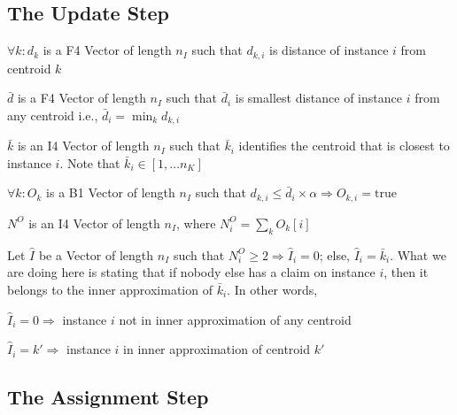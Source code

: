 \subsection{The Update Step}
\label{update}

\be
\item \(\forall k: d_k \) is a F4 Vector of length \(n_I\) such that \(d_{k, i}\)
is distance of instance \(i\) from centroid \(k\)
\item \(\bar{d}\) is a F4 Vector of length \(n_I\) such that \(\bar{d}_i\) is
smallest distance of instance \(i\) from any centroid i.e.,
\(\bar{d}_i = \min_k d_{k, i}\)
\item \(\bar{k}\) is an I4 Vector of length \(n_I\) such that \(\bar{k}_i\) identifies
the centroid that is closest to instance \(i\). Note that 
\(\bar{k}_i \in [1, \ldots n_K]\)
\item \(\forall k: O_k\) is a B1 Vector of length \(n_I\) such that 
\(d_{k, i} \leq \bar{d}_i \times \alpha \Rightarrow O_{k, i} = \mathrm{true}\)
\item \(N^O\) is an I4 Vector of length \(n_I\), 
where \(N^O_i  = \sum_k O_k[i]\)
\item Let \(\hat{I}\) be a Vector of length \(n_I\) such that 
\(N^O_i \geq 2 \Rightarrow \hat{I}_i = 0\); else, \(\hat{I}_i = \bar{k}_i\). What
we are doing here is stating that if nobody else has a claim on instance \(i\), then
it belongs to the inner approximation of \(\bar{k}_i\). In other words,
\be
\item \(\hat{I}_i = 0 \Rightarrow \) instance \(i\) not in inner approximation
of any centroid
\item \(\hat{I}_i = k' \Rightarrow \) instance \(i\) in inner approximation
of centroid \(k'\)
\ee
\ee

\subsection{The Assignment Step}
\label{assignment}




